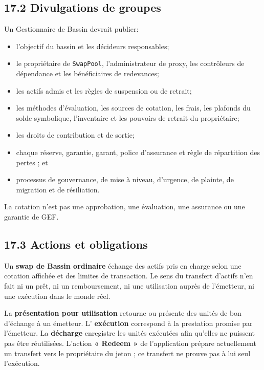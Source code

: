 \documentclass[11pt]{article}
\begin{document}
\subsection*{17.2 Divulgations de groupes}

Un Gestionnaire de Bassin devrait publier:

\begin{itemize}[leftmargin=*]
\item l'objectif du bassin et les décideurs responsables;
\item le propriétaire de \texttt{SwapPool}, l'administrateur de proxy, les contrôleurs de dépendance et les bénéficiaires de redevances;
\item les actifs admis et les règles de suspension ou de retrait;
\item les méthodes d'évaluation, les sources de cotation, les frais, les plafonds du solde symbolique, l'inventaire et les pouvoirs de retrait du propriétaire;
\item les droits de contribution et de sortie;
\item chaque réserve, garantie, garant, police d'assurance et règle de répartition des pertes ; et
\item processus de gouvernance, de mise à niveau, d'urgence, de plainte, de migration et de résiliation.
\end{itemize}
La cotation n'est pas une approbation, une évaluation, une assurance ou une garantie de GEF.

\subsection*{17.3 Actions et obligations}

Un \textbf{swap de Bassin ordinaire} échange des actifs pris en charge selon une cotation affichée et des limites de transaction. Le sens du transfert d'actifs n'en fait ni un prêt, ni un remboursement, ni une utilisation auprès de l'émetteur, ni une exécution dans le monde réel.

La \textbf{présentation pour utilisation } retourne ou présente des unités de bon d'échange à un émetteur. L'\textbf{ exécution } correspond à la prestation promise par l'émetteur. La \textbf{ décharge } enregistre les unités exécutées afin qu'elles ne puissent pas être réutilisées. L'action \textbf{« Redeem »} de l'application prépare actuellement un transfert vers le propriétaire du jeton ; ce transfert ne prouve pas à lui seul l'exécution.
\end{document}
